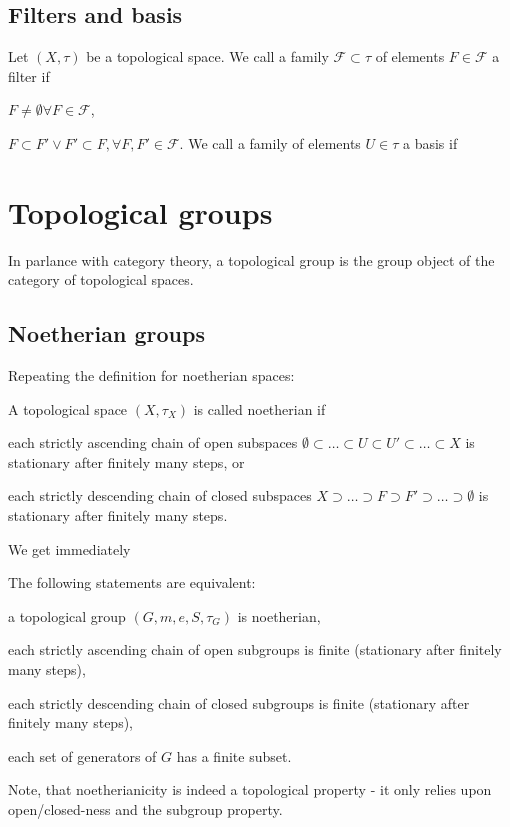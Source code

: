 \subsection{Filters and basis}
\begin{defi}
Let $(X,\tau)$ be a topological space. We call a family $\mathcal{F} \subset \tau$ of elements $F \in \mathcal{F}$ a filter if
\bn
\item $F \neq \emptyset \forall F \in \mathcal{F}$,
\item $F \subset F' \vee F' \subset F, \forall F, F' \in \mathcal{F}$.
\en
We call a family of elements $U \in \tau$ a basis if 
\end{defi}
\section{Topological groups}
In parlance with category theory, a topological group is the group object of the category of topological spaces.

\subsection{Noetherian groups}
Repeating the definition for noetherian spaces:
\begin{defi}
A topological space $(X,\tau_X)$ is called noetherian if
\bn
\item each strictly ascending chain of open subspaces $\emptyset \subset \ldots \subset U \subset U' \subset \ldots \subset X$ is stationary after finitely many steps, or
\item each strictly descending chain of closed subspaces $X \supset \ldots \supset F \supset F' \supset \ldots \supset \emptyset$ is stationary after finitely many steps.
\en
\end{defi}
We get immediately
\begin{coro}
The following statements are equivalent:
\bn
\item a topological group $(G, m, e, S, \tau_G)$ is noetherian,
\item each strictly ascending chain of open subgroups is finite (stationary after finitely many steps),
\item each strictly descending chain of closed subgroups is finite (stationary after finitely many steps),
\item each set of generators of $G$ has a finite subset.
\en
\end{coro}
Note, that noetherianicity is indeed a topological property - it only relies upon open/closed-ness and the subgroup property.

